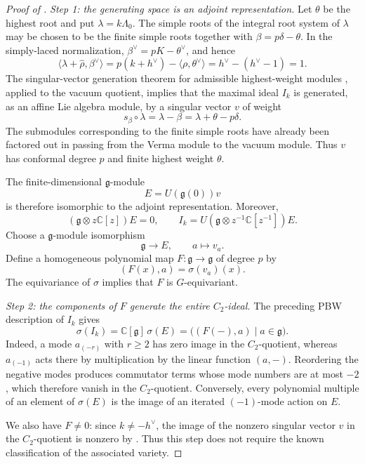 \documentclass[11pt,reqno]{amsart}
\theoremstyle{remark}
\newcommand{\g}{\mathfrak g}
\newcommand{\C}{\mathbb C}
\begin{document}
\begin{proof}[Proof of ]
\noindent
\emph{Step 1: the generating space is an adjoint representation.}
Let $\theta$ be the highest root and put $\lambda=k\Lambda_0$. The
simple roots of the integral root system of $\lambda$ may be chosen
to be the finite simple roots together with $\beta=p\delta-\theta$.
In the simply-laced normalization, $\beta^\vee=pK-\theta^\vee$, and
hence
\[
\langle\lambda+\widehat\rho,\beta^\vee\rangle
=
p(k+h^\vee)-\langle\rho,\theta^\vee\rangle
=
h^\vee-(h^\vee-1)
=
1.
\]
The singular-vector generation theorem for admissible highest-weight
modules \cite{KW0,KW1}, applied to the vacuum quotient, implies that
the maximal ideal $I_k$ is generated, as an affine Lie algebra module,
by a singular vector $v$ of weight
\[
s_\beta\mathbin{\circ}\lambda
=
\lambda-\beta
=
\lambda+\theta-p\delta.
\]
The submodules corresponding to the finite simple roots have already
been factored out in passing from the Verma module to the vacuum
module. Thus $v$ has conformal degree $p$ and finite highest weight
$\theta$.

The finite-dimensional $\g$-module
\[
E=U(\g(0))v
\]
is therefore isomorphic to the adjoint representation. Moreover,
\[
(\g\otimes z\C[z])E=0,
\qquad
I_k=U(\g\otimes z^{-1}\C[z^{-1}])E.
\]
Choose a $\g$-module isomorphism
\[
\g\longrightarrow E,\qquad a\longmapsto v_a.
\]
Define a homogeneous polynomial map $F:\g\to\g$ of degree $p$ by
\begin{equation}
\label{eq:F}
(F(x),a)=\sigma(v_a)(x).
\end{equation}
The equivariance of $\sigma$ implies that $F$ is $G$-equivariant.

\medskip
\noindent
\emph{Step 2: the components of $F$ generate the entire $C_2$-ideal.}
The preceding PBW description of $I_k$ gives
\begin{equation}
\label{eq:ideal}
\sigma(I_k)
=
\C[\g]\,\sigma(E)
=
\bigl((F(-),a)\mid a\in\g\bigr).
\end{equation}
Indeed, a mode $a_{(-r)}$ with $r\geq2$ has zero image in the
$C_2$-quotient, whereas $a_{(-1)}$ acts there by multiplication by
the linear function $(a,-)$. Reordering the negative modes produces
commutator terms whose mode numbers are at most $-2$, which therefore
vanish in the $C_2$-quotient. Conversely, every polynomial multiple
of an element of $\sigma(E)$ is the image of an iterated $(-1)$-mode
action on $E$.

We also have $F\neq0$: since $k\neq-h^\vee$, the image of the nonzero
singular vector $v$ in the $C_2$-quotient is nonzero by
\cite[Theorem~1.2]{AJM}. Thus this step does not require the known
classification of the associated variety.


\end{proof}
\end{document}
